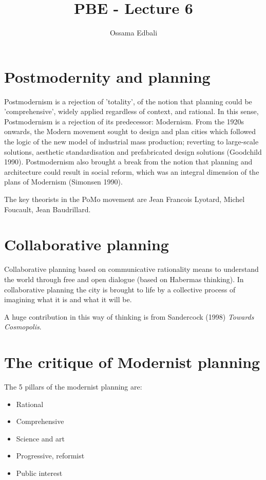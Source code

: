 \documentclass{article}
\title{PBE - Lecture 6}
\author{Ossama Edbali}
\begin{document}
	
	\maketitle
	
	\section*{Postmodernity and planning}	
	Postmodernism is a rejection of 'totality', of the notion that planning could be 'comprehensive', widely applied regardless of context, and rational. In this sense, Postmodernism is a rejection of its predecessor: Modernism. From the 1920s onwards, the Modern movement sought to design and plan cities which followed the logic of the new model of industrial mass production; reverting to large-scale solutions, aesthetic standardisation and prefabricated design solutions (Goodchild 1990). Postmodernism also brought a break from the notion that planning and architecture could result in social reform, which was an integral dimension of the plans of Modernism (Simonsen 1990).
	
	The key theorists in the PoMo movement are Jean Francois Lyotard, Michel Foucault, Jean Baudrillard.
	
	\section*{Collaborative planning}
	Collaborative planning based on communicative rationality means to understand the world through
	free and open dialogue (based on Habermas thinking).
	In collaborative planning the city is brought to life by a collective process of imagining what it is
	and what it will be.
	
	A huge contribution in this way of thinking is from Sandercock (1998) \textit{Towards Cosmopolis}.
	
	\section*{The critique of Modernist planning}
	The 5 pillars of the modernist planning are:
	\begin{itemize}
		\item Rational
		\item Comprehensive
		\item Science and art
		\item Progressive, reformist
		\item Public interest
	\end{itemize}
	
\end{document}
